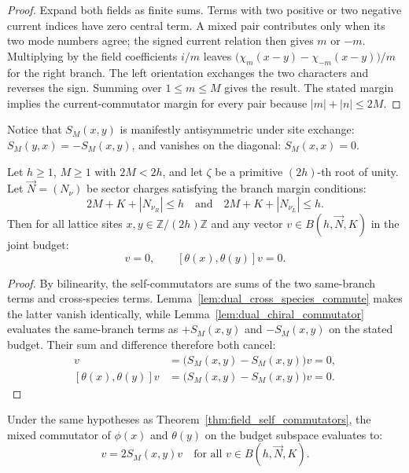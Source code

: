 \begin{proof}
Expand both fields as finite sums. Terms with two positive or two negative current indices have zero central term. A mixed pair contributes only when its two mode numbers agree; the signed current relation then gives $m$ or $-m$. Multiplying by the field coefficients $i/m$ leaves $\bigl(\chi_m(x-y)-\chi_{-m}(x-y)\bigr)/m$ for the right branch. The left orientation exchanges the two characters and reverses the sign. Summing over $1\le m\le M$ gives the result. The stated margin implies the current-commutator margin for every pair because $|m|+|n|\le2M$.
\end{proof}

Notice that $S_M(x, y)$ is manifestly antisymmetric under site exchange: $S_M(y, x) = -S_M(x, y)$, and vanishes on the diagonal: $S_M(x, x) = 0$.

\begin{theorem}
\label{thm:field_self_commutators}
Let $h \ge 1$, $M \ge 1$ with $2M < 2h$, and let $\zeta$ be a primitive $(2h)$-th root of unity. Let $\vec{N} = (N_\nu)$ be sector charges satisfying the branch margin conditions:
\begin{equation}
2M + K + |N_{\nu_R}| \le h \quad \text{and} \quad 2M + K + |N_{\nu_L}| \le h.
\end{equation}
Then for all lattice sites $x, y \in \mathbb{Z}/(2h)\mathbb{Z}$ and any vector $v \in B(h, \vec{N}, K)$ in the joint budget:
\begin{equation}
[\phi(x), \phi(y)] v = 0, \qquad [\theta(x), \theta(y)] v = 0.
\end{equation}
\end{theorem}

\begin{proof}
By bilinearity, the self-commutators are sums of the two same-branch terms and cross-species terms. Lemma~\ref{lem:dual_cross_species_commute} makes the latter vanish identically, while Lemma~\ref{lem:dual_chiral_commutator} evaluates the same-branch terms as $+S_M(x,y)$ and $-S_M(x,y)$ on the stated budget. Their sum and difference therefore both cancel:
\begin{align}
[\phi(x),\phi(y)]v &= \bigl(S_M(x,y)-S_M(x,y)\bigr)v=0, \\
[\theta(x),\theta(y)]v &= \bigl(S_M(x,y)-S_M(x,y)\bigr)v=0.
\end{align}
\end{proof}

\begin{theorem}
\label{thm:mixed_field_commutator}
Under the same hypotheses as Theorem~\ref{thm:field_self_commutators}, the mixed commutator of $\phi(x)$ and $\theta(y)$ on the budget subspace evaluates to:
\begin{equation}
[\phi(x), \theta(y)] v = 2 S_M(x, y) v \quad \text{for all } v \in B(h, \vec{N}, K).
\end{equation}
\end{theorem}

